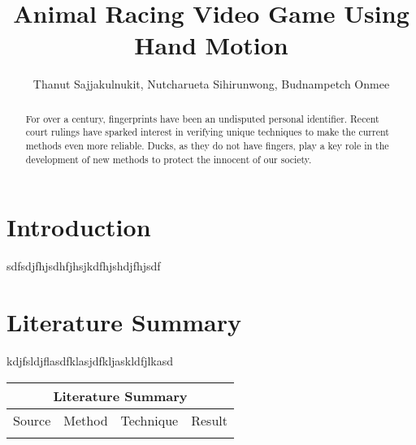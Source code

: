 \documentclass[12pt, oneside]{article}										%
\title{Animal Racing Video Game Using Hand Motion}
\author{Thanut Sajjakulnukit, Nutcharueta Sihirunwong, Budnampetch Onmee}
\begin{document}
        \maketitle														    %
        \begin{multicols*}{2}
        \twocolumn
        \begin{abstract}                                                    %
            For over a century, fingerprints have been an undisputed
            personal identifier.  Recent court rulings have sparked
            interest in verifying unique techniques to make the current
            methods even more reliable. Ducks, as they do not have
            fingers, play a key role in the development of new methods to
            protect the innocent of our society.
        \end{abstract}

        \section{Introduction}                                              %
            sdfsdjfhjsdhfjhsjkdfhjshdjfhjsdf
            
        \section{Literature Summary}                                        %
            kdjfsldjflasdfklasjdfkljaskldfjlkasd

                \begin{center}
                \begin{tabular}{ |p{2cm}|p{2cm}|p{2cm}|p{2cm}|  }
                    \hline
                    \multicolumn{4}{|c|}{Literature Summary} \\
                    \hline
                    Source & Method & Technique & Result \\ \hline
                    & & & \\ \hline
                \end{tabular}
            \end{center}
            
            
        \end{multicols*}
    \blinddocument
\end{document}
